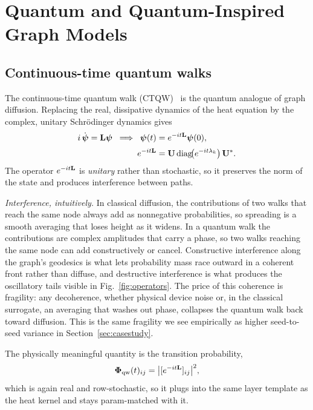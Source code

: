 \section{Quantum and Quantum-Inspired Graph Models}
\label{sec:quantum}

\subsection{Continuous-time quantum walks}
The continuous-time quantum walk
(CTQW)~\cite{childs2004quantumwalk,venegas2012quantumwalks} is the quantum analogue of
graph diffusion. Replacing the real, dissipative dynamics of the heat equation by the
complex, unitary Schr\"odinger dynamics gives
\begin{equation}
\begin{aligned}
i\,\dot{\boldsymbol{\psi}}=\mathbf{L}\boldsymbol{\psi}
\;\;\Longrightarrow\;\;
\boldsymbol{\psi}(t)&=e^{-it\mathbf{L}}\boldsymbol{\psi}(0),\\[2pt]
e^{-it\mathbf{L}}&=\mathbf{U}\,\mathrm{diag}\!\big(e^{-it\lambda_k}\big)\,\mathbf{U}^{*}.
\end{aligned}
\label{eq:qwalk}
\end{equation}
The operator $e^{-it\mathbf{L}}$ is \emph{unitary} rather than stochastic, so it preserves
the norm of the state and produces interference between paths.

\textit{Interference, intuitively.} In classical diffusion, the contributions of two
walks that reach the same node always add as nonnegative probabilities, so spreading is
a smooth averaging that loses height as it widens. In a quantum walk the contributions
are complex amplitudes that carry a phase, so two walks reaching the same node can add
constructively or cancel. Constructive interference along the graph's geodesics is what
lets probability mass race outward in a coherent front rather than diffuse, and
destructive interference is what produces the oscillatory tails visible in
Fig.~\ref{fig:operators}. The price of this coherence is fragility: any decoherence,
whether physical device noise or, in the classical surrogate, an averaging that washes
out phase, collapses the quantum walk back toward diffusion. This is the same fragility
we see empirically as higher seed-to-seed variance in Section~\ref{sec:casestudy}.

The physically meaningful quantity is the transition probability,
\begin{equation}
\boldsymbol{\Phi}_{\mathrm{qw}}(t)_{ij}=\big|[e^{-it\mathbf{L}}]_{ij}\big|^2 ,
\label{eq:qwprob}
\end{equation}
which is again real and row-stochastic, so it plugs into the same layer template as
the heat kernel and stays param-matched with it.

